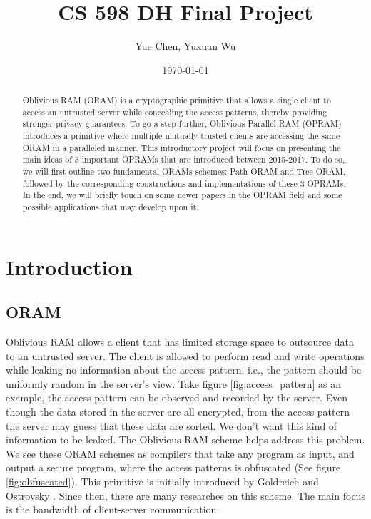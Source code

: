 \documentclass[fontsize=11pt]{article}
\title{CS 598 DH Final Project}
\author{Yue Chen, Yuxuan Wu}
\date{\today}
\begin{document}
\maketitle


\begin{abstract}
Oblivious RAM (ORAM) is a cryptographic primitive that allows a single client to access an untrusted server while concealing the access patterns, thereby providing stronger privacy guarantees. To go a step further, Oblivious Parallel RAM (OPRAM) introduces a primitive where multiple mutually trusted clients are accessing the same ORAM in a paralleled manner. This introductory project will focus on presenting the main ideas of 3 important OPRAMs that are introduced between 2015-2017. To do so, we will first outline two fundamental ORAMs schemes: Path ORAM and Tree ORAM, followed by the corresponding constructions and implementations of these 3 OPRAMs. In the end, we will briefly touch on some newer papers in the OPRAM field and some possible applications that may develop upon it.
\end{abstract}

\section{Introduction}
\subsection{ORAM}
Oblivious RAM allows a client that has limited storage space to outsource data to an untrusted server. The client is allowed to perform read and write operations while leaking no information about the access pattern, i.e., the pattern should be uniformly random in the server's view. Take figure \ref{fig:access_pattern} as an example, the access pattern can be observed and recorded by the server. Even though the data stored in the server are all encrypted, from the access pattern the server may guess that these data are sorted. We don't want this kind of information to be leaked. The Oblivious RAM scheme helps address this problem. We see these ORAM schemes as compilers that take any program as input, and output a secure program, where the access patterns is obfuscated (See figure \ref{fig:obfuscated}).
This primitive is initially introduced by Goldreich and Ostrovsky \cite{GO96}. Since then, there are many researches on this scheme. The main focus is the bandwidth of client-server communication. 
\end{document}
